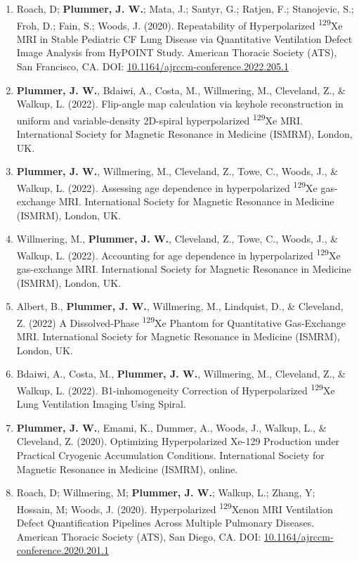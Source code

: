 \documentclass[12pt,]{scrartcl}
\begin{document}
\begin{enumerate}
  \item Roach, D; \textbf{Plummer, J. W.}; Mata, J.; Santyr, G.; Ratjen, F.; Stanojevic, S.; Froh, D.; Fain, S.; Woods, J. (2020). Repeatability of Hyperpolarized \textsuperscript{129}Xe MRI in Stable Pediatric CF Lung Disease via Quantitative Ventilation Defect Image Analysis from HyPOINT Study. American Thoracic Society (ATS), San Francisco, CA. DOI: \href{https://www.atsjournals.org/doi/abs/10.1164/ajrccm-conference.2022.205.1_MeetingAbstracts.A2555}{10.1164/ajrccm-conference.2022.205.1}
  \item \textbf{Plummer, J. W.}, Bdaiwi, A., Costa, M., Willmering, M., Cleveland, Z., \& Walkup, L. (2022). Flip-angle map calculation via keyhole reconstruction in uniform and variable-density 2D-spiral hyperpolarized \textsuperscript{129}Xe MRI. International Society for Magnetic Resonance in Medicine (ISMRM), London, UK.
  \item \textbf{Plummer, J. W.}, Willmering, M., Cleveland, Z., Towe, C., Woods, J., \& Walkup, L. (2022). Assessing age dependence in hyperpolarized \textsuperscript{129}Xe gas-exchange MRI. International Society for Magnetic Resonance in Medicine (ISMRM), London, UK.
  \item  Willmering, M., \textbf{Plummer, J. W.}, Cleveland, Z., Towe, C., Woods, J., \& Walkup, L. (2022). Accounting for age dependence in hyperpolarized \textsuperscript{129}Xe gas-exchange MRI. International Society for Magnetic Resonance in Medicine (ISMRM), London, UK.
  \item Albert, B., \textbf{Plummer, J. W.}, Willmering, M., Lindquist, D., \& Cleveland, Z. (2022) A Dissolved-Phase \textsuperscript{129}Xe Phantom for Quantitative Gas-Exchange MRI. International Society for Magnetic Resonance in Medicine (ISMRM), London, UK.
  \item  Bdaiwi, A., Costa, M., \textbf{Plummer, J. W.}, Willmering, M., Cleveland, Z., \& Walkup, L. (2022). B1-inhomogeneity Correction of Hyperpolarized \textsuperscript{129}Xe Lung Ventilation Imaging Using Spiral.
  \item \textbf{Plummer, J. W.}, Emami, K., Dummer, A., Woods, J., Walkup, L., \& Cleveland, Z. (2020). Optimizing Hyperpolarized Xe-129 Production under Practical Cryogenic Accumulation Conditions. International Society for Magnetic Resonance in Medicine (ISMRM), online.   
  \item Roach, D; Willmering, M; \textbf{Plummer, J. W.}; Walkup, L.; Zhang, Y; Hossain, M; Woods, J. (2020). Hyperpolarized \textsuperscript{129}Xenon MRI Ventilation Defect Quantification Pipelines Across Multiple Pulmonary Diseases. American Thoracic Society (ATS), San Diego, CA. DOI: \href{https://www.atsjournals.org/doi/pdf/10.1164/ajrccm-conference.2020.201.1_MeetingAbstracts.A7893}{10.1164/ajrccm-conference.2020.201.1}

\end{enumerate}
\end{document}
